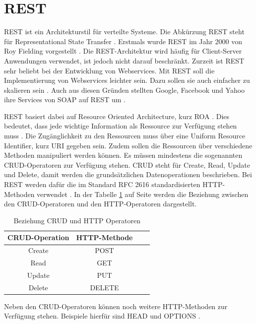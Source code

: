 \documentclass{llncs}
\begin{document}
\section{REST}
REST ist ein Architekturstil für verteilte Systeme. Die Abkürzung REST steht für Representational State Transfer \cite{chakrabarti2009test}.
Erstmals wurde REST im Jahr 2000 von Roy Fielding vorgestellt \citep{kao2013performance}.
Die REST-Architektur wird häufig für Client-Server Anwendungen verwendet, ist jedoch nicht darauf beschränkt.
Zurzeit ist REST sehr beliebt bei der Entwicklung von Webservices. Mit REST soll die Implementierung von Webservices leichter sein. Dazu sollen sie auch einfacher zu skalieren sein \cite{chakrabarti2009test}. 
Auch aus diesen Gründen stellten Google, Facebook und Yahoo ihre Services von SOAP auf REST um \cite{rodriguez2008restful, navas2014rest}.

REST basiert dabei auf Resource Oriented Architecture, kurz ROA \citep{chakrabarti2009test}. Dies bedeutet, dass jede wichtige Information als Ressource zur Verfügung stehen muss \cite{porres2011modeling}.
Die Zugänglichkeit zu den Ressourcen muss über eine Uniform Resource Identifier, kurz URI gegeben sein. Zudem sollen die Ressourcen über verschiedene Methoden manipuliert werden können. Es müssen mindestens die sogenannten CRUD-Operatoren zur Verfügung stehen. CRUD steht für Create, Read, Update und Delete, damit werden die grundsätzlichen Datenoperationen beschrieben. Bei REST werden dafür die im Standard RFC 2616 standardisierten HTTP-Methoden verwendet \citep{kao2013performance}. In der Tabelle \ref{tab:CRUD_HTTP_Methods} auf Seite \pageref{tab:CRUD_HTTP_Methods} werden die Beziehung zwischen den CRUD-Operatoren und den HTTP-Operatoren dargestellt.

\begin{table}[htbp]
\centering
\begin{tabular}{|c|c|p{4cm}|p{4cm}|}
\hline
\multicolumn{1}{|l|}{CRUD-Operation} & HTTP-Methode \\ \hline
Create & POST  \\ \hline
Read & GET \\ \hline
Update & PUT \\ \hline
Delete & DELETE \\ \hline
\end{tabular}
\caption{Beziehung CRUD und HTTP Operatoren \cite{reza2010framework}}
\label{tab:CRUD_HTTP_Methods}
\end{table}

Neben den CRUD-Operatoren können noch weitere HTTP-Methoden zur Verfügung stehen. Beispiele hierfür sind HEAD und OPTIONS \cite{porres2011modeling}.
\end{document}
